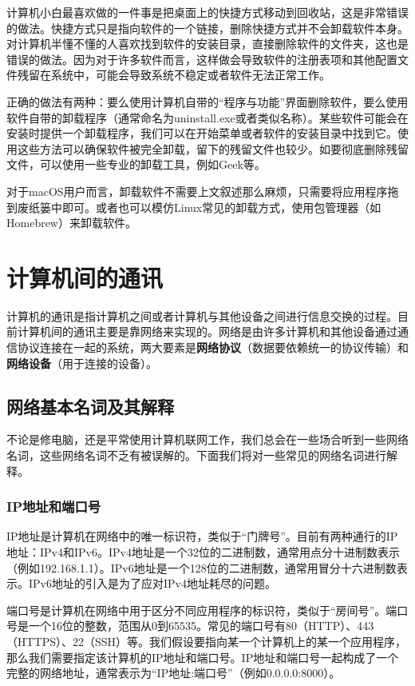 \documentclass[../main.tex]{subfiles}
\begin{document}
计算机小白最喜欢做的一件事是把桌面上的快捷方式移动到回收站，这是非常错误的做法。快捷方式只是指向软件的一个链接，删除快捷方式并不会卸载软件本身。对计算机半懂不懂的人喜欢找到软件的安装目录，直接删除软件的文件夹，这也是错误的做法。因为对于许多软件而言，这样做会导致软件的注册表项和其他配置文件残留在系统中，可能会导致系统不稳定或者软件无法正常工作。

正确的做法有两种：要么使用计算机自带的“程序与功能”界面删除软件，要么使用软件自带的卸载程序（通常命名为uninstall.exe或者类似名称）。某些软件可能会在安装时提供一个卸载程序，我们可以在开始菜单或者软件的安装目录中找到它。使用这些方法可以确保软件被完全卸载，留下的残留文件也较少。如要彻底删除残留文件，可以使用一些专业的卸载工具，例如Geek等。

\begin{tcolorbox}[title=提示]
  对于macOS用户而言，卸载软件不需要上文叙述那么麻烦，只需要将应用程序拖到废纸篓中即可。或者也可以模仿Linux常见的卸载方式，使用包管理器（如Homebrew）来卸载软件。
\end{tcolorbox}

\section{计算机间的通讯}

计算机的通讯是指计算机之间或者计算机与其他设备之间进行信息交换的过程。目前计算机间的通讯主要是靠网络来实现的。网络是由许多计算机和其他设备通过通信协议连接在一起的系统，两大要素是\textbf{网络协议}（数据要依赖统一的协议传输）和\textbf{网络设备}（用于连接的设备）。

\subsection{网络基本名词及其解释}

不论是修电脑，还是平常使用计算机联网工作，我们总会在一些场合听到一些网络名词，这些网络名词不乏有被误解的。下面我们将对一些常见的网络名词进行解释。

\subsubsection{IP地址和端口号}
IP地址是计算机在网络中的唯一标识符，类似于“门牌号”。目前有两种通行的IP地址：IPv4和IPv6。IPv4地址是一个32位的二进制数，通常用点分十进制数表示（例如192.168.1.1）。IPv6地址是一个128位的二进制数，通常用冒分十六进制数表示。IPv6地址的引入是为了应对IPv4地址耗尽的问题。

端口号是计算机在网络中用于区分不同应用程序的标识符，类似于“房间号”。端口号是一个16位的整数，范围从0到65535。常见的端口号有80（HTTP）、443（HTTPS）、22（SSH）等。我们假设要指向某一个计算机上的某一个应用程序，那么我们需要指定该计算机的IP地址和端口号。IP地址和端口号一起构成了一个完整的网络地址，通常表示为“IP地址:端口号”（例如0.0.0.0:8000）。
\end{document}
